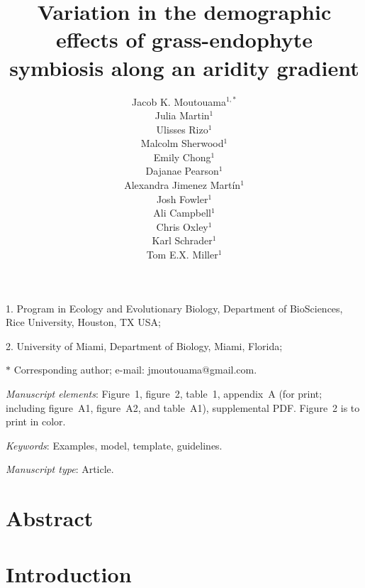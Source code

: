 \documentclass[11pt]{article}
\title{Variation in the demographic effects of grass-endophyte symbiosis along an aridity gradient }
\author{Jacob K. Moutouama$^{1,\ast}$ \\ 
Julia Martin$^{1}$ \\ 
Ulisses Rizo$^{1}$\\
Malcolm Sherwood$^{1}$\\
Emily Chong$^{1}$\\
Dajanae Pearson$^{1}$\\
Alexandra Jimenez Martín$^{1}$\\
Josh Fowler$^{1}$\\
Ali Campbell$^{1}$\\
Chris Oxley$^{1}$\\
Karl Schrader$^{1}$\\
Tom E.X. Miller$^{1}$\\}
\date{}
\begin{document}
\maketitle

\noindent{} 1. Program in Ecology and Evolutionary Biology, Department of BioSciences, Rice University, Houston, TX USA;

\noindent{} 2. University of Miami, Department of Biology, Miami, Florida;

\noindent{} $\ast$ Corresponding author; e-mail: jmoutouama@gmail.com.


\bigskip

\textit{Manuscript elements}: Figure~1, figure~2, table~1, appendix~A (for print; including figure~A1, figure~A2, and table~A1), supplemental PDF. Figure~2 is to print in color.

\bigskip

\textit{Keywords}: Examples, model, template, guidelines.

\bigskip

\textit{Manuscript type}: Article. %

\bigskip


\linenumbers{}
\modulolinenumbers[1]

\newpage{}

\section*{Abstract}

\newpage{}

\section*{Introduction}

\end{document}
